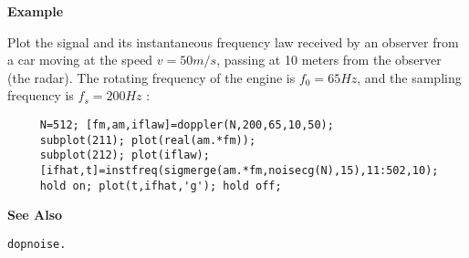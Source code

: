 \newpage

{\bf \large \sf Example}\\
\hspace*{1.5cm}
\begin{minipage}[t]{13.5cm}
Plot the signal and its instantaneous frequency law received by an observer
from a car moving at the speed $v=50 m/s$, passing at 10 meters from the
observer (the radar). The rotating frequency of the engine is $f_0=65 Hz$,
and the sampling frequency is $f_s=200 Hz$ :
\begin{verbatim}
     N=512; [fm,am,iflaw]=doppler(N,200,65,10,50); 
     subplot(211); plot(real(am.*fm)); 
     subplot(212); plot(iflaw);
     [ifhat,t]=instfreq(sigmerge(am.*fm,noisecg(N),15),11:502,10);
     hold on; plot(t,ifhat,'g'); hold off;
\end{verbatim}
\end{minipage}
\vspace*{.5cm}


{\bf \large \sf See Also}\\
\hspace*{1.5cm}
\begin{minipage}[t]{13.5cm}
\begin{verbatim}
dopnoise.
\end{verbatim}
\end{minipage}

